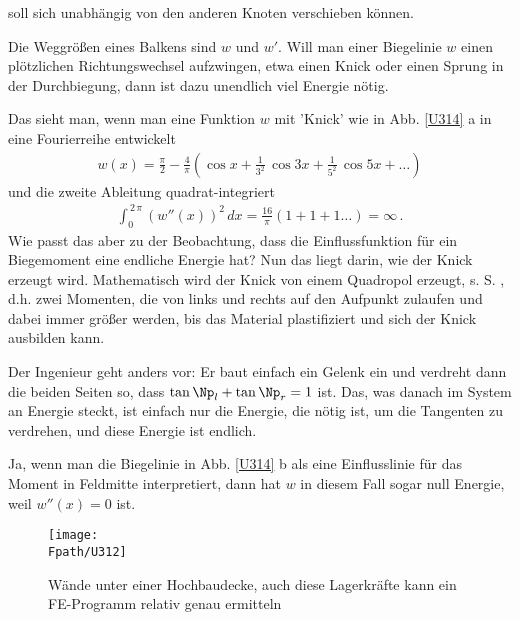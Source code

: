 soll sich unabh\"{a}ngig von den anderen Knoten verschieben k\"{o}nnen.

\begin{remark}
Die Weggr\"{o}{\ss}en eines Balkens sind $w$ und $w'$. Will man einer Biegelinie $w$  einen pl\"{o}tzlichen Richtungswechsel aufzwingen, etwa einen Knick oder einen Sprung in der Durchbiegung, dann ist dazu unendlich viel Energie n\"{o}tig.

Das sieht man, wenn man eine Funktion $w$ mit 'Knick' wie in Abb. \ref{U314} a in eine Fourierreihe entwickelt
\begin{align}
w(x)= \frac{\pi}{2} - \frac{4}{\pi}(\cos x + \frac{1}{3^2}\,\cos 3x + \frac{1}{5^2}\,\cos 5x + \ldots )
\end{align}
und die zweite Ableitung quadrat-integriert
\begin{align}
\int_0^{\,2\,\pi} (w''(x))^2\,dx = \frac{16}{\pi} (1 + 1 + 1 \ldots ) = \infty\,.
\end{align}
Wie passt das aber zu der Beobachtung, dass die Einflussfunktion f\"{u}r ein Biegemoment eine endliche Energie hat? Nun das liegt darin, wie der Knick erzeugt wird. Mathematisch wird der Knick von einem Quadropol erzeugt, s. S. \pageref{U303}, d.h. zwei Momenten, die von links und rechts auf den Aufpunkt zulaufen und dabei immer gr\"{o}{\ss}er werden, bis das Material plastifiziert und sich der Knick ausbilden kann.

Der Ingenieur geht anders vor: Er baut einfach ein Gelenk ein und verdreht dann die beiden Seiten so, dass $\tan \Np_l + \tan \Np_r = 1$ ist. Das, was danach im System an Energie steckt, ist einfach nur die Energie, die n\"{o}tig ist, um die Tangenten zu verdrehen, und diese Energie ist endlich.

Ja, wenn man die Biegelinie in Abb. \ref{U314} b als eine Einflusslinie f\"{u}r das Moment in Feldmitte interpretiert, dann hat $w$ in diesem Fall sogar null Energie, weil $w''(x) = 0$ ist.
\end{remark}



\begin{figure}[tbp]
\centering
\texttt{[image: \\Fpath/U312]}
\caption{W\"{a}nde unter einer Hochbaudecke, auch diese Lagerkr\"{a}fte kann ein FE-Programm relativ genau ermitteln} \label{U312} %
\end{figure}%

